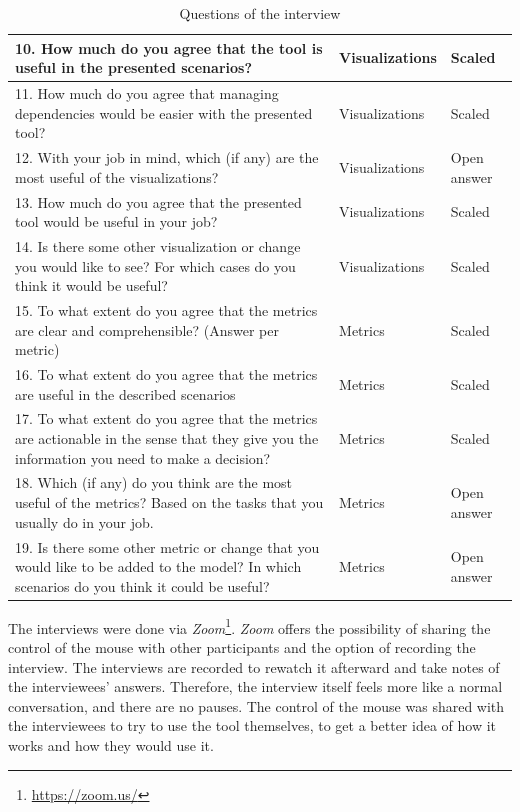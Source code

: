 \begin{table}[p]
\begin{center}
\begin{tabularx}{\textwidth}{|X|l|l|}
    \hline
    10.	How much do you agree that the tool is useful in the presented scenarios? & Visualizations & Scaled \\\hline
    11.	How much do you agree that managing dependencies would be easier with the presented tool? & Visualizations & Scaled \\\hline
    12.	With your job in mind, which (if any) are the most useful of the visualizations? & Visualizations & Open answer \\\hline
    13.	How much do you agree that the presented tool would be useful in your job? & Visualizations & Scaled \\\hline
    14.	Is there some other visualization or change you would like to see? For which cases do you think it would be useful? & Visualizations & Scaled \\\hline
    \hline
    15.	To what extent do you agree that the metrics are clear and comprehensible? (Answer per metric) & Metrics & Scaled \\\hline
    16.	To what extent do you agree that the metrics are useful in the described scenarios & Metrics & Scaled \\\hline
    17.	To what extent do you agree that the metrics are actionable in the sense that they give you the information you need to make a decision? & Metrics & Scaled \\\hline
    18.	Which (if any) do you think are the most useful of the metrics? Based on the tasks that you usually do in your job. & Metrics & Open answer \\\hline
    19.	Is there some other metric or change that you would like to be added to the model? In which scenarios do you think it could be useful? & Metrics & Open answer \\\hline
    \end{tabularx}
    \end{center}
    \caption{Questions of the interview}
    \label{table:interview-questions}
\end{table}

The interviews were done via \textit{Zoom}\footnote{\url{https://zoom.us/}}. \textit{Zoom} offers the possibility of sharing the control of the mouse with other participants and the option of recording the interview. The interviews are recorded to rewatch it afterward and take notes of the interviewees' answers. Therefore, the interview itself feels more like a normal conversation, and there are no pauses. The control of the mouse was shared with the interviewees to try to use the tool themselves, to get a better idea of how it works and how they would use it.

